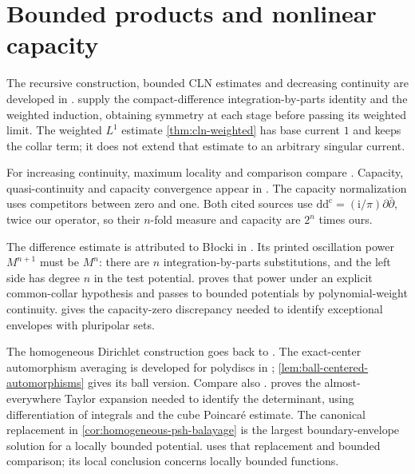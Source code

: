 \section{Bounded products and nonlinear capacity}
\label{sec:history-bounded-products}
The recursive construction, bounded CLN estimates and decreasing continuity are developed in \cite[Chapter III, Section 3, (3.1)--(3.11), pp.~144--150]{DemBook}.  supply the compact-difference integration-by-parts identity and the weighted induction, obtaining symmetry at each stage before passing its weighted limit. The weighted $L^1$ estimate \cref{thm:cln-weighted} has base current $1$ and keeps the collar term; it does not extend that estimate to an arbitrary singular current.

For increasing continuity, maximum locality and comparison compare \cite[Theorem 3.23, pp.~89--91, and Theorems 3.27 and 3.29, pp.~93--94]{GZ17}. Capacity, quasi-continuity and capacity convergence appear in \cite[Proposition 4.19, Theorem 4.20 and Lemma 4.21, pp.~110--112, and Theorem 4.26, pp.~114--115]{GZ17}. The capacity normalization uses competitors between zero and one. Both cited sources use $\mathrm{dd}^{\mathrm c}=(\mathrm{i}/\pi)\partial\bar\partial$, twice our operator, so their $n$-fold measure and capacity are $2^n$ times ours.

The difference estimate is attributed to B\l{}ocki in \cite[Proposition 3.21, pp.~88--89]{GZ17}. Its printed oscillation power $M^{n+1}$ must be $M^n$: there are $n$ integration-by-parts substitutions, and the left side has degree $n$ in the test potential.  proves that power under an explicit common-collar hypothesis and passes to bounded potentials by polynomial-weight continuity.  gives the capacity-zero discrepancy needed to identify exceptional envelopes with pluripolar sets.


The homogeneous Dirichlet construction goes back to \cite{BT76}. The exact-center automorphism averaging is developed for polydiscs in \cite[Section 2.3, Theorem 2.3.2 and Proposition 2.3.3, pp.~50--52]{Blo02Pluripotential}; \cref{lem:ball-centered-automorphisms} gives its ball version. Compare also \cite[Theorems 5.13--5.14, pp.~143--149]{GZ17}.  proves the almost-everywhere Taylor expansion needed to identify the determinant, using differentiation of integrals and the cube Poincar\'e estimate. The canonical replacement in \cref{cor:homogeneous-psh-balayage} is the largest boundary-envelope solution for a locally bounded potential.  uses that replacement and bounded comparison; its local conclusion concerns locally bounded functions.



